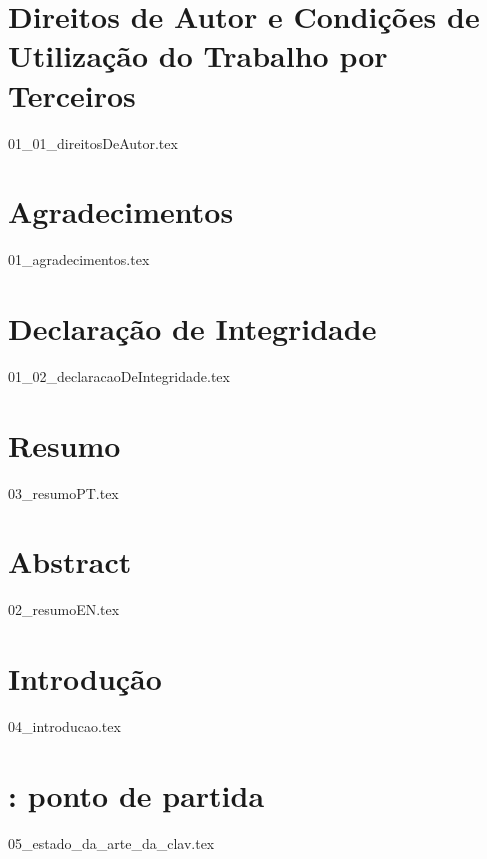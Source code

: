 \documentclass[
  oneside,
  12pt, a4paper,
  footinclude=true,
  headinclude=true,
  cleardoublepage=empty
]{scrbook}
\author{José Carlos Lima Martins}
\date{\myear} %
\begin{document}
    \umfrontcover{}
    \umtitlepage{}
	
    \chapter*{Direitos de Autor e Condições de Utilização do Trabalho por Terceiros}
    {01_01_direitosDeAutor.tex}

	\chapter*{Agradecimentos}
    {01_agradecimentos.tex}

    \chapter*{Declaração de Integridade}
    {01_02_declaracaoDeIntegridade.tex}

	\chapter*{Resumo}
    {03_resumoPT.tex}

    \cleardoublepage{}

	\chapter*{Abstract}
    {02_resumoEN.tex}
	
	\tableofcontents
	\listoffigures
	\listoftables
	\lstlistoflistings
    \printglossary[type=\acronymtype, title={Lista de Acrónimos}, style=treenoname]
	
    \cleardoublepage{}
	
    \chapter{Introdução}
    {04_introducao.tex}

    \chapter{: ponto de partida}\label{cap:soa_clav}
    {05_estado_da_arte_da_clav.tex}
\end{document}
